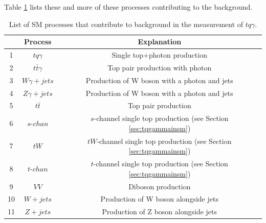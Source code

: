 Table \ref{tab:background} lists these and more of these processes contributing to the background.
\begin{table}
    \centering
    \begin{tabular}{c c c}
        \toprule
        {} & Process & Explanation\\
        \midrule
        1 & $tq\gamma$&         Single top+photon production\\[.1cm]
        2 & $t\bar{t}\gamma$&   Top pair production with photon\\[.1cm]
        3 & $W\gamma + jets$&   Production of W boson with a photon and jets\\[.1cm]
        4 & $Z\gamma + jets$&   Production of W boson with a photon and jets\\[.1cm]
        5 & $t\bar{t}$&         Top pair production\\[.1cm]
        6 & $s\text{-}chan$&    $s$-channel single top production (see Section \ref{sec:tqgammainsm})\\[.1cm]
        7 & $t W$&              $tW$-channel single top production (see Section \ref{sec:tqgammainsm})\\[.1cm]
        8 & $t\text{-}chan$&    $t$-channel single top production (see Section \ref{sec:tqgammainsm})\\[.1cm]
        9 & $VV$&               Diboson production\\[.1cm]
        10& $W+jets$&           Production of W boson alongside jets\\[.1cm]
        11& $Z+jets$&           Production of Z boson alongside jets\\[.1cm]
        \bottomrule
    \end{tabular}
    \caption{List of SM processes that contribute to background in the measurement of $tq\gamma$.}
    \label{tab:background}
\end{table}





